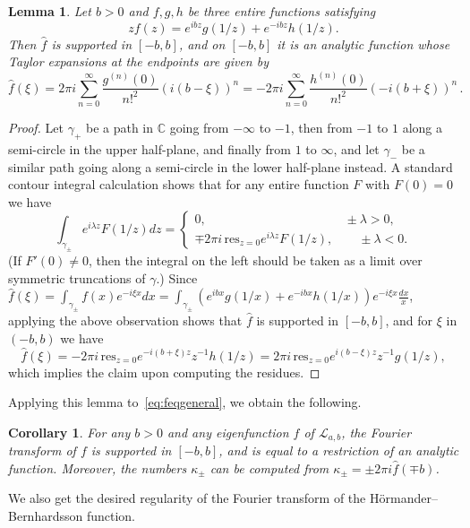 \documentclass[12pt]{amsart}
\theoremstyle{plain}
\newtheorem{lemma}[theorem]{Lemma}
\newtheorem{corollary}[theorem]{Corollary}
\numberwithin{equation}{section}
\theoremstyle{definition}
\newcommand{\C}{\mathbb{C}}
\begin{document}
\begin{lemma} \label{lem:genfourier}
	Let $b>0$ and $f,g,h$ be three entire functions satisfying
	\[zf(z) = e^{ibz}g(1/z) + e^{-ibz}h(1/z).\]
	Then $\widehat{f}$ is supported in $[-b,b]$, and on $[-b,b]$ it is an analytic function whose Taylor expansions at the endpoints are given by
	\[\widehat{f}(\xi) =   2\pi i\sum_{n=0}^{\infty}\frac{g^{(n)}(0)}{n!^2}(  i(b-\xi))^n
	                            = -2\pi i\sum_{n=0}^{\infty}\frac{h^{(n)}(0)}{n!^2}(-i(b+\xi))^n\,.\]
\end{lemma}
\begin{proof}
	Let $\gamma_{+}$ be a path in $\C$ going from $-\infty$ to $-1$, then from $-1$ to $1$ along a semi-circle in the upper half-plane, and finally from $1$ to $\infty$, and let $\gamma_{-}$ be a similar path going along a semi-circle in the lower half-plane instead. A standard contour integral calculation shows that for any entire function $F$ with $F(0)=0$ we have
	\[\int_{\gamma_{\pm}}e^{i\lambda z}F(1/z)dz = \begin{cases}
		0,\qquad\qquad\qquad\qquad\qquad\quad \pm\lambda>0,\\
		\mp2\pi i\,\mathrm{res}_{z=0}e^{i\lambda z}F(1/z),\qquad \pm\lambda<0.
	\end{cases}\]
	(If $F'(0)\ne0$, then the integral on the left should be taken as a limit over symmetric truncations of $\gamma$.)
	Since $\widehat{f}(\xi) = \int_{\gamma_{\pm}}f(x)e^{-i\xi x}dx=\int_{\gamma_{\pm}}(e^{ibx}g(1/x)+e^{-ibx}h(1/x))e^{-i\xi x}\frac{dx}{x}$, applying the above observation shows that $\widehat{f}$ is supported in $[-b,b]$, and for $\xi$ in $(-b,b)$ we have
	\[\widehat{f}(\xi) 
	= -2\pi i\,\mathrm{res}_{z=0}e^{-i(b+\xi)z}z^{-1}h(1/z)
	= 2\pi i\,\mathrm{res}_{z=0}e^{i(b-\xi)z}z^{-1}g(1/z),\]
	which implies the claim upon computing the residues.
\end{proof}
Applying this lemma to~\eqref{eq:feqgeneral}, we obtain the following.

\begin{corollary} \label{cor:fourier}
	For any $b>0$ and any eigenfunction $f$ of $\mathcal{L}_{a,b}$, the Fourier transform of $f$ is supported in $[-b,b]$, and is equal to a restriction of an analytic function. Moreover, the numbers $\kappa_{\pm}$ can be computed from $\kappa_{\pm} = \pm 2\pi i\widehat{f}(\mp b)$.
\end{corollary}

We also get the desired regularity of the Fourier transform of the H\"ormander--Bernhardsson function.
\end{document}
